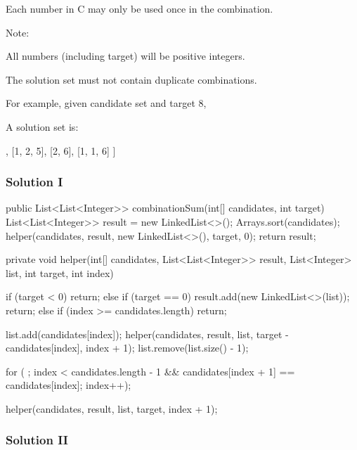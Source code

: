 Each number in C may only be used once in the combination.

Note:

All numbers (including target) will be positive integers.

The solution set must not contain duplicate combinations.

For example, given candidate set \code{[10, 1, 2, 7, 6, 1, 5]} and target 8,

A solution set is:
\begin{Code}
[
  [1, 7],
  [1, 2, 5],
  [2, 6],
  [1, 1, 6]
]
\end{Code}

\subsubsection{Solution I}

\begin{Code}
public List<List<Integer>> combinationSum(int[] candidates, int target) {
    List<List<Integer>> result = new LinkedList<>();
    Arrays.sort(candidates);
    helper(candidates, result, new LinkedList<>(), target, 0);
    return result;
}

private void helper(int[] candidates, List<List<Integer>> result, List<Integer> list, int target, int index) {
    if (target < 0) {
        return;
    } else if (target == 0) {
        result.add(new LinkedList<>(list));
        return;
    } else if (index >= candidates.length) {
        return;
    }

    list.add(candidates[index]);
    helper(candidates, result, list, target - candidates[index], index + 1);
    list.remove(list.size() - 1);

    for ( ; index < candidates.length - 1 && candidates[index + 1] == candidates[index]; index++);

    helper(candidates, result, list, target, index + 1);
}
\end{Code}

\newpge

\subsubsection{Solution II}

